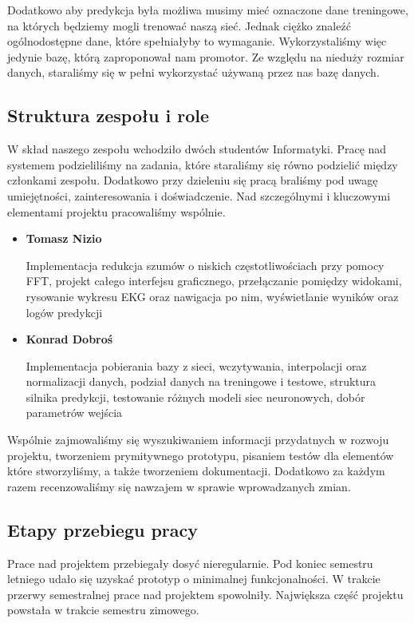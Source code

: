 \documentclass[polish,12pt]{aghthesis}
\begin{document}
Dodatkowo aby predykcja była możliwa musimy mieć oznaczone dane treningowe, na których będziemy mogli trenować naszą sieć. Jednak ciężko znaleźć ogólnodostępne dane, które spełniałyby to wymaganie. Wykorzystaliśmy więc jedynie bazę, którą zaproponował nam promotor. Ze względu na nieduży rozmiar danych, staraliśmy się w pełni wykorzystać używaną przez nas bazę danych.

\subsection{Struktura zespołu i role}

W skład naszego zespołu wchodziło dwóch studentów Informatyki. Pracę nad systemem podzieliliśmy na zadania, które staraliśmy się równo podzielić między członkami zespołu. Dodatkowo przy dzieleniu się pracą braliśmy pod uwagę umiejętności, zainteresowania i doświadczenie. Nad szczególnymi i kluczowymi elementami projektu pracowaliśmy wspólnie.

\begin{itemize}
	\item \textbf{Tomasz Nizio}	
	
	Implementacja redukcja szumów o niskich częstotliwościach przy pomocy FFT, projekt całego interfejsu graficznego, przełączanie pomiędzy widokami, rysowanie wykresu EKG oraz nawigacja po nim, wyświetlanie wyników oraz logów predykcji
	\item  \textbf{Konrad Dobroś}
	
	Implementacja pobierania bazy z sieci, wczytywania, interpolacji oraz normalizacji danych, podział danych na treningowe i testowe, struktura silnika predykcji, testowanie różnych modeli siec neuronowych, dobór parametrów wejścia
	
\end{itemize}

Wspólnie zajmowaliśmy się wyszukiwaniem informacji przydatnych w rozwoju projektu, tworzeniem prymitywnego prototypu, pisaniem testów dla elementów które stworzyliśmy, a także tworzeniem dokumentacji.
Dodatkowo za każdym razem recenzowaliśmy się nawzajem w sprawie wprowadzanych zmian.

\subsection{Etapy przebiegu pracy}

Prace nad projektem przebiegały dosyć nieregularnie. Pod koniec semestru letniego udało się uzyskać prototyp o minimalnej funkcjonalności. W trakcie przerwy semestralnej prace nad projektem spowolniły. Największa część projektu powstała w trakcie semestru zimowego. 
\end{document}
